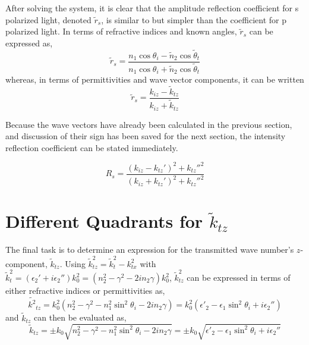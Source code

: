 \documentclass[12pt]{uthesis-v12}
\begin{document}
After solving the system, it is clear that the amplitude reflection coefficient for s polarized light, denoted $\tilde{r}_s$, is similar to but simpler than the coefficient for p polarized light. In terms of refractive indices and known angles, $\tilde{r}_s$ can be expressed as,
\begin{equation}\label{eq-rs(n,theta)}
\tilde{r}_s=\frac{n_1\cos\theta_i-\tilde{n}_2\cos\tilde{\theta}_t}
{n_1\cos\theta_i+\tilde{n}_2\cos\tilde{\theta}_t}
\end{equation}
whereas, in terms of permittivities and wave vector components, it can be written
\begin{equation}\label{eq-rs(k,epsilon)}
\tilde{r}_s=\frac{k_{iz}-\tilde{k}_{tz}}{k_{iz}+\tilde{k}_{tz}}
\end{equation}

Because the wave vectors have already been calculated in the previous section, and discussion of their sign has been saved for the next section, the intensity reflection coefficient can be stated immediately.

\begin{equation}\label{eq-Rs}
R_s=\frac{(k_{iz}-k_{tz}')^2+k_{tz}''^2}{(k_{iz}+k_{tz}')^2+k_{tz}''^2}
\end{equation}

\section{Different Quadrants for $\tilde{k}_{tz}$}\label{planeWaves-differentQuadrants}

The final task is to determine an expression for the transmitted wave number's $z$-component, $\tilde{k}_{tz}$. Using $\tilde{k}_{tz}^2=\tilde{k}_t^2-k_{tx}^2$ with $\tilde{k}_t^2=(\epsilon_2'+i\epsilon_2'')k_0^2
=(n_2^2-\gamma^2-2in_2\gamma)k_0^2$, $\tilde{k}_{tz}^2$ can be expressed in terms of either refractive indices or permittivities as,
\begin{equation}\label{eq-ktz2Definition}
\tilde{k^2}_{tz}=k_0^2\left(n_2^2-\gamma^2-n_1^2\sin^2\theta_i-2in_2\gamma\right)
=k_0^2\left(\epsilon'_2-\epsilon_1\sin^2\theta_i+i\epsilon_2''\right)
\end{equation}
and $\tilde{k}_{tz}$ can then be evaluated as,
\begin{equation}\label{eq-ktzDefinition}
\tilde{k}_{tz}=\pm k_0\sqrt{n_2^2-\gamma^2-n_1^2\sin^2\theta_i-2in_2\gamma}
=\pm k_0\sqrt{\epsilon'_2-\epsilon_1\sin^2\theta_i+i\epsilon_2''}
\end{equation}
\end{document}
